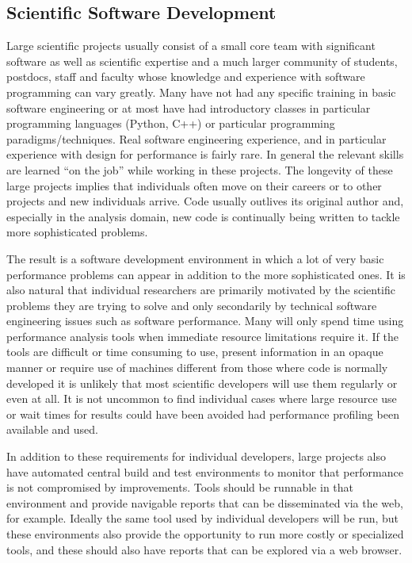 \documentclass[notitlepage,letter,12pt]{article}
\begin{document}
\subsection{Scientific Software Development}

Large scientific projects usually consist of a small core team with
significant software as well as scientific expertise and a much larger 
community of
students, postdocs, staff and faculty whose knowledge and experience
with software programming can vary greatly. Many have not had any
specific training in basic software engineering or at most have had
introductory classes in particular programming languages (Python,
C++) or particular programming paradigms/techniques. Real software
engineering experience, and in particular experience with design
for performance is fairly rare. In general the relevant skills are
learned ``on the job'' while working in these projects. The longevity
of these large projects implies that individuals often move on their
careers or to other projects and new individuals arrive.  Code
usually outlives its original author and, especially in the analysis
domain, new code is continually being written to tackle more
sophisticated problems.

The result is a software development environment in which a lot of
very basic performance problems can appear in addition to the more
sophisticated ones.  It is also natural that individual researchers
are primarily motivated by the scientific problems they are trying
to solve and only secondarily by technical software engineering
issues such as software performance.  Many will only spend time
using performance analysis tools when immediate resource limitations
require it. If the tools are difficult or time consuming to use,
present information in an opaque manner or require use of machines
different from those where code is normally developed it is unlikely
that most scientific developers will use them regularly or even at
all. It is not uncommon to find individual cases where large resource
use or wait times for results could have been avoided had performance
profiling been available and used.

In addition to these requirements for individual developers, large
projects also have automated central build and test environments
to monitor that performance is not compromised by improvements.
Tools should be runnable in that environment and provide navigable
reports that can be disseminated via the web, for example. Ideally
the same tool used by individual developers will be run, but these
environments also provide the opportunity to run more costly
or specialized tools, and these should also have reports that can
be explored via a web browser.
\end{document}
